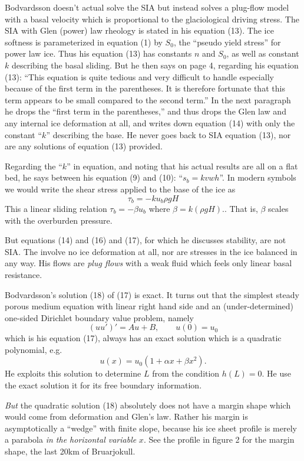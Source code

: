 \documentclass[twocolumn,letterpaper]{igs}
\begin{document}
Bodvardsson doesn't actual solve the SIA but instead solves a plug-flow model with a basal velocity which is proportional to the glaciological driving stress.  The SIA with Glen (power) law rheology is stated in his equation (13).  The ice softness is parameterized in equation (1) by $S_0$, the ``pseudo yield stress'' for power law ice.  Thus his equation (13) has constants $n$ and $S_0$, as well as constant $k$ describing the basal sliding.  But he then says on page 4, regarding his equation (13): ``This equation is quite tedious and very difficult to handle especially because of the first term in the parentheses.  It is therefore fortunate that this term appears to be small compared to the second term.''  In the next paragraph he drops the ``first term in the parentheses,'' and thus drops the Glen law and any internal ice deformation at all, and writes down equation (14) with only the constant ``$k$'' describing the base.  He never goes back to SIA equation (13), nor are any solutions of equation (13) provided.

Regarding the ``$k$'' in equation, and noting that his actual results are all on a flat bed, he says between his equation (9) and (10): ``$s_b = k v w h$''.  In modern symbols we would write the shear stress applied to the base of the ice as
  $$\tau_b = - k u_b \rho g H$$
This a linear sliding relation $\tau_b = - \beta u_b$ where $\beta = k (\rho g H).$.  That is, $\beta$ scales with the overburden pressure.

But equations (14) and (16) and (17), for which he discusses stability, are not SIA.  The involve no ice deformation at all, nor are stresses in the ice balanced in any way.  His flows are \emph{plug flows} with a weak fluid which feels only linear basal resistance.

Bodvardsson's solution (18) of (17) is exact.  It
turns out that the simplest steady porous medium equation with linear
right hand side and an (under-determined) one-sided Dirichlet boundary
value problem, namely
  $$(u u')' = Au+B, \qquad  u(0) = u_0$$
which is his equation (17), always has an exact solution which is a
quadratic polynomial, e.g.
   $$u(x) = u_0 (1 + \alpha x + \beta x^2).$$
He exploits this solution to determine $L$ from the condition $h(L)=0$.
He use the exact solution it for its free boundary information.

\emph{But} the quadratic solution (18) absolutely does not have a margin
shape which would come from deformation and Glen's law.  Rather his
margin is asymptotically a ``wedge'' with finite slope, because his ice
sheet profile is merely a parabola \emph{in the horizontal variable} $x$.
See the profile in figure 2 for the margin shape, the last 20km of
Bruarjokull.
\end{document}
